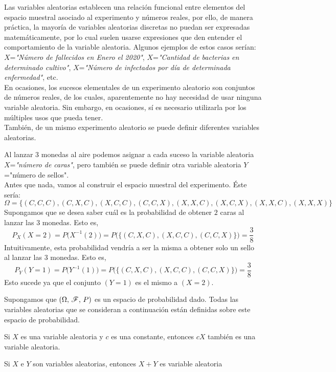 Las variables aleatorias establecen una relación funcional entre elementos del espacio muestral asociado al experimento y números reales, por ello, de manera práctica, la mayoría de variables aleatorias discretas no puedan ser expresadas matemáticamente, por lo cual suelen usarse expresiones que den entender el comportamiento de la variable aleatoria. Algunos ejemplos de estos casos serían: $X$=\textit{"Número de fallecidos en Enero el 2020"}, $X$=\textit{"Cantidad de bacterias en determinado cultivo"}, $X$=\textit{"Número de infectados por día de determinada enfermedad"}, etc.\\
En ocasiones, los sucesos elementales de un experimento aleatorio son conjuntos de números reales, de los cuales, aparentemente no hay necesidad de usar ninguna variable aleatoria. Sin embargo, en ocasiones, sí es necesario utilizarla por los múltiples usos que pueda tener.\\
También, de un mismo experimento aleatorio se puede definir diferentes variables aleatorias.
\begin{Ejm}
    Al lanzar $3$ monedas al aire podemos asignar a cada suceso la variable aleatoria $X$=\textit{"número de caras"}, pero también se puede definir otra variable aleatoria $Y$="número de sellos". \\
    Antes que nada, vamos al construir el espacio muestral del experimento. Éste sería:
    $$\Omega = \{(C,C,C),(C,X,C), (X,C,C), (C,C,X), (X,X,C), (X,C,X), (X,X,C), (X,X,X)\}$$
Supongamos que se desea saber cuál es la probabilidad de obtener $2$ caras al lanzar las $3$ monedas.
Esto es, $$P_{X}(X=2)= P\big(X^{-1}(2)\big)= P\big(\big\{(C,X,C), (X,C,C), (C,C,X)\big\}\big)=\frac{3}{8}$$
Intuitivamente, esta probabilidad vendría a ser la misma a obtener solo un sello al lanzar las $3$ monedas.
Esto es,
$$P_{Y}(Y=1)= P\big(Y^{-1}(1)\big)= P\big(\big\{(C,X,C), (X,C,C), (C,C,X)\big\}\big)=\frac{3}{8}$$
Esto sucede ya que el conjunto $(Y=1)$ es el mismo a $(X=2)$.
\end{Ejm}
Supongamos que $(\Omega,\thinspace \mathscr{F},\thinspace P)$ es un espacio de probabilidad dado. Todas las variables aleatorias que se consideran a continuación están definidas sobre este espacio de probabilidad.
\begin{Prop}
    Si $X$ es una variable aleatoria y $c$ es una constante, entonces $c X$ también es una variable aleatoria.
    \label{prop-variableAl-cXesVA}
\end{Prop}
\begin{Prop}
    Si $X$ e $Y$ son variables aleatorias, entonces $X+Y$ es variable aleatoria
    \label{prop-variableAl-X+YesVA}
\end{Prop}
